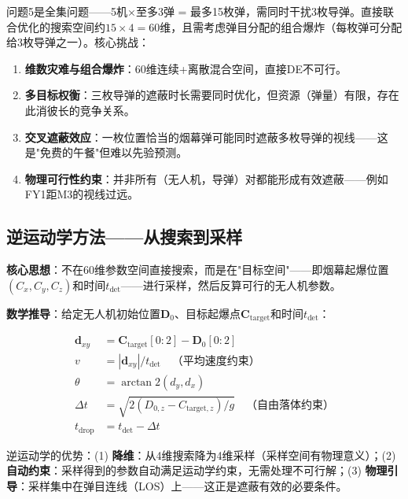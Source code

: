 \documentclass[12pt,a4paper]{ctexart}
\begin{document}
问题5是全集问题——5机$\times$至多3弹 = 最多15枚弹，需同时干扰3枚导弹。直接联合优化的搜索空间约$15\times4=60$维，且需考虑弹目分配的组合爆炸（每枚弹可分配给3枚导弹之一）。核心挑战：

\begin{enumerate}[label=(\arabic*)]
    \item \textbf{维数灾难与组合爆炸}：60维连续+离散混合空间，直接DE不可行。
    \item \textbf{多目标权衡}：三枚导弹的遮蔽时长需要同时优化，但资源（弹量）有限，存在此消彼长的竞争关系。
    \item \textbf{交叉遮蔽效应}：一枚位置恰当的烟幕弹可能同时遮蔽多枚导弹的视线——这是"免费的午餐"但难以先验预测。
    \item \textbf{物理可行性约束}：并非所有（无人机，导弹）对都能形成有效遮蔽——例如FY1距M3的视线过远。
\end{enumerate}

\subsection{逆运动学方法——从搜索到采样}

\textbf{核心思想}：不在60维参数空间直接搜索，而是在"目标空间"——即烟幕起爆位置$(C_x,C_y,C_z)$和时间$t_{\text{det}}$——进行采样，然后反算可行的无人机参数。

\textbf{数学推导}：给定无人机初始位置$\mathbf{D}_0$、目标起爆点$\mathbf{C}_{\text{target}}$和时间$t_{\text{det}}$：

\begin{align}
    \mathbf{d}_{xy} &= \mathbf{C}_{\text{target}}[0:2] - \mathbf{D}_0[0:2] \\
    v &= |\mathbf{d}_{xy}| / t_{\text{det}} \quad \text{（平均速度约束）} \\
    \theta &= \arctan2(d_y, d_x) \\
    \Delta t &= \sqrt{2(D_{0,z} - C_{\text{target},z}) / g} \quad \text{（自由落体约束）} \\
    t_{\text{drop}} &= t_{\text{det}} - \Delta t
\end{align}

逆运动学的优势：(1) \textbf{降维}：从4维搜索降为4维采样（采样空间有物理意义）；(2) \textbf{自动约束}：采样得到的参数自动满足运动学约束，无需处理不可行解；(3) \textbf{物理引导}：采样集中在弹目连线（LOS）上——这正是遮蔽有效的必要条件。
\end{document}
